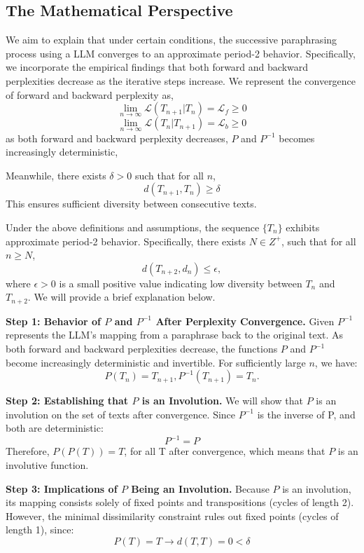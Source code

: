 \iffalse

\subsection{The Mathematical Perspective}

We aim to explain that under certain conditions, the successive paraphrasing process using a LLM converges to an approximate period-2 behavior. Specifically, we incorporate the empirical findings that both forward and backward perplexities decrease as the iterative steps increase.
We represent the convergence of forward and backward perplexity as,
\[
\lim_{n\to\infty}\mathcal{L}(T_{n+1}|T_{n})=\mathcal{L}_f \geq 0    
\]
\[
\lim_{n\to\infty}\mathcal{L}(T_{n}|T_{n+1})=\mathcal{L}_b \geq 0    
\]
as both forward and backward perplexity decreases, \(P\) and \(P^{-1}\) becomes increasingly deterministic, 

Meanwhile, there exists \(\delta>0\) such that for all \(n\),
\[
d(T_{n+1},T_n) \geq \delta
\]
This ensures sufficient diversity between consecutive texts.


Under the above definitions and assumptions, the sequence \(\{T_n\}\) exhibits approximate period-2 behavior.
Specifically, there exists \(N \in Z^+\), such that for all \( n \geq N \),
\[
d(T_{n+2},d_{n}) \leq \epsilon,
\]
where \(\epsilon > 0\) is a small positive value indicating low diversity between \(T_n\) and \(T_{n+2}\). 
We will provide a brief explanation below.


\textbf{Step 1: Behavior of \(P\) and \(P^{-1}\) After Perplexity Convergence.}
Given \(P^{-1}\) represents the LLM’s mapping from a paraphrase back to the original text.
As both forward and backward perplexities decrease, the functions 
\(P\) and \(P^{-1} \) become increasingly deterministic and invertible. 
For sufficiently large \(n\), we have:
\[
P(T_n) = T_{n+1}, P^{-1}(T_{n+1}) = T_n.
\]

\textbf{Step 2: Establishing that \(P\) is an Involution.}
We will show that \(P\) is an involution on the set of texts after convergence.
Since \(P^{-1}\) is the inverse of P, and both are deterministic:
\[P^{-1}=P\]
Therefore, \(P(P(T)) = T\), for all T after convergence, which means that \(P\) is an involutive function.



\textbf{Step 3: Implications of \(P\) Being an Involution.}
Because \(P\) is an involution, its mapping consists solely of fixed points and
transpositions (cycles of length 2). 
However, the minimal dissimilarity constraint rules out fixed points (cycles of length 1), since:
\[P(T) = T \rightarrow d(T, T) = 0 < \delta\]

